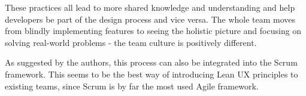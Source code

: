 These practices all lead to more shared knowledge and understanding and help developers be part of
the design process and vice versa. The whole team moves from blindly implementing features to seeing
the holistic picture and focusing on solving real-world problems - the team culture is positively
different.

As suggested by the authors, this process can also be integrated into the Scrum framework. This
seems to be the best way of introducing Lean UX principles to existing teams, since Scrum is by far
the most used Agile framework.
